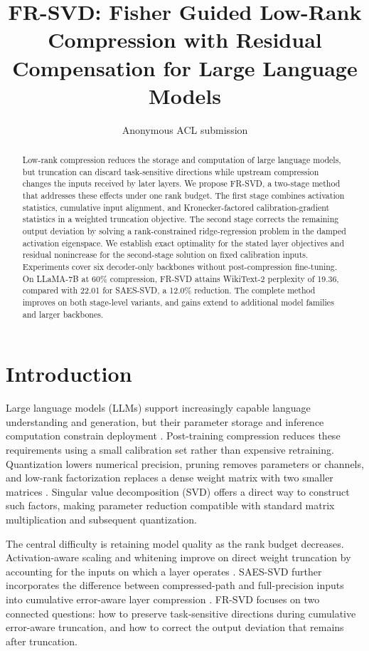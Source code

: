 \documentclass[11pt]{article}
\title{FR-SVD: Fisher Guided Low-Rank Compression with Residual Compensation for Large Language Models}
\author{Anonymous ACL submission}
\begin{document}
\raggedbottom
\maketitle

\begin{abstract}
Low-rank compression reduces the storage and computation of large language models, but truncation can discard task-sensitive directions while upstream compression changes the inputs received by later layers. We propose FR-SVD, a two-stage method that addresses these effects under one rank budget. The first stage combines activation statistics, cumulative input alignment, and Kronecker-factored calibration-gradient statistics in a weighted truncation objective. The second stage corrects the remaining output deviation by solving a rank-constrained ridge-regression problem in the damped activation eigenspace. We establish exact optimality for the stated layer objectives and residual nonincrease for the second-stage solution on fixed calibration inputs. Experiments cover six decoder-only backbones without post-compression fine-tuning. On LLaMA-7B at 60\% compression, FR-SVD attains WikiText-2 perplexity of 19.36, compared with 22.01 for SAES-SVD, a 12.0\% reduction. The complete method improves on both stage-level variants, and gains extend to additional model families and larger backbones.
\end{abstract}

\section{Introduction}\label{sec:intro}

Large language models (LLMs) support increasingly capable language understanding and generation, but their parameter storage and inference computation constrain deployment \citep{touvron2023llama,touvron2023llama2,dubey2024llama3}. Post-training compression reduces these requirements using a small calibration set rather than expensive retraining. Quantization lowers numerical precision, pruning removes parameters or channels, and low-rank factorization replaces a dense weight matrix with two smaller matrices \citep{frantar2023gptq,lin2023awq,frantar2023sparsegpt,ma2023llmpruner,ashkboos2024slicegpt}. Singular value decomposition (SVD) offers a direct way to construct such factors, making parameter reduction compatible with standard matrix multiplication and subsequent quantization.

The central difficulty is retaining model quality as the rank budget decreases. Activation-aware scaling and whitening improve on direct weight truncation by accounting for the inputs on which a layer operates \citep{yuan2023asvd,wang2025svdllm,wang2025svdllmv2}. SAES-SVD further incorporates the difference between compressed-path and full-precision inputs into cumulative error-aware layer compression \citep{hu2026saessvd}. FR-SVD focuses on two connected questions: how to preserve task-sensitive directions during cumulative error-aware truncation, and how to correct the output deviation that remains after truncation.
\end{document}
